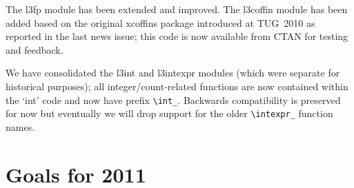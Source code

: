 \documentclass{ltnews}
\begin{document}
The \textsf{l3fp} module has been extended and improved.
The \textsf{l3coffin} module has been added based on the original \textsf{xcoffins} package introduced at TUG~2010 as reported in the last news issue; this code is now available from CTAN for testing and feedback.

We have consolidated the \textsf{l3int} and \textsf{l3intexpr} modules (which were separate for historical purposes); all integer/count-related functions are now contained within the `\textsf{int}' code and now have prefix \verb|\int_|. Backwards compatibility is preserved for now but eventually we will drop support for the older \verb|\intexpr_| function names.

\section{Goals for 2011}
\end{document}
